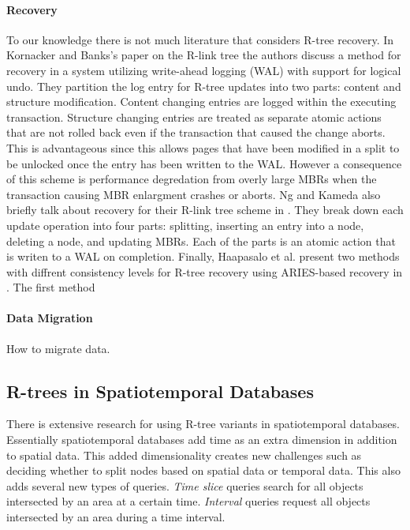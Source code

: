 \paragraph{Recovery} To our knowledge there is not much literature that considers
R-tree recovery. In Kornacker and Banks's paper on the R-link tree 
\cite{kornacker1995high} the authors discuss a method for recovery in a system 
utilizing write-ahead logging (WAL) with support for logical undo. They partition the 
log entry for R-tree updates into two parts: content and structure modification. 
Content changing entries are logged within the executing transaction. Structure 
changing entries are treated as separate atomic actions that are not rolled back 
even if the transaction that caused the change aborts. This is advantageous since
this allows pages that have been modified in a split to be unlocked once the entry
has been written to the WAL. However a consequence of this scheme is performance
degredation from overly large MBRs when the transaction causing MBR enlargment 
crashes or aborts. Ng and Kameda also briefly talk about recovery for their R-link
tree scheme in \cite{ng1994r}. They break down each update operation into four parts:
splitting, inserting an entry into a node, deleting a node, and updating MBRs. Each
of the parts is an atomic action that is writen to a WAL on completion. Finally, 
Haapasalo et al. present two methods with diffrent consistency levels for R-tree 
recovery using ARIES-based recovery \cite{ARIES} in \cite{haapasalo2013recovery}. The
first method 
	
\paragraph{Data Migration} How to migrate data.


\subsection{R-trees in Spatiotemporal Databases}
There is extensive research for using R-tree variants in spatiotemporal
databases. Essentially spatiotemporal databases add time as an extra dimension
in addition to spatial data. This added dimensionality creates new challenges
such as deciding whether to split nodes based on spatial data or temporal data. 
This also adds several new types of queries. \emph{Time slice}
queries search for all objects intersected by an area at a certain time. 
\emph{Interval} queries request all objects intersected by an area during a time
interval.

